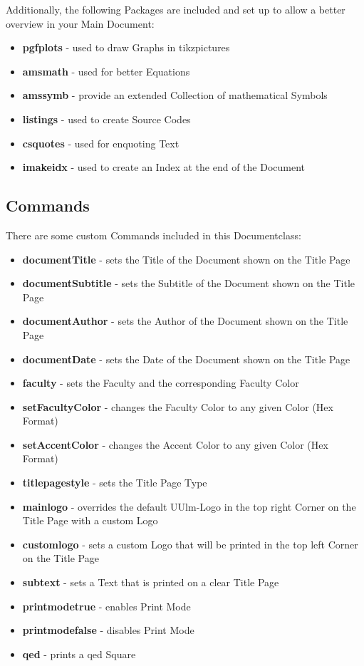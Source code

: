 \documentclass[a4paper]{../uulm-document}
\begin{document}
Additionally, the following Packages are included and set up to allow a better overview in your Main Document:
\begin{itemize}
\item \textbf{pgfplots} - used to draw Graphs in tikzpictures
\item \textbf{amsmath} - used for better Equations
\item \textbf{amssymb} - provide an extended Collection of mathematical Symbols
\item \textbf{listings} - used to create Source Codes
\item \textbf{csquotes} - used for enquoting Text
\item \textbf{imakeidx} - used to create an Index at the end of the Document
\end{itemize}

\subsection{Commands}
There are some custom Commands included in this Documentclass:
\begin{itemize}
\item \textbf{documentTitle} - sets the Title of the Document shown on the Title Page
\item \textbf{documentSubtitle} - sets the Subtitle of the Document shown on the Title Page
\item \textbf{documentAuthor} - sets the Author of the Document shown on the Title Page
\item \textbf{documentDate} - sets the Date of the Document shown on the Title Page
\item \textbf{faculty} - sets the Faculty and the corresponding Faculty Color
\item \textbf{setFacultyColor} - changes the Faculty Color to any given Color (Hex Format)
\item \textbf{setAccentColor} - changes the Accent Color to any given Color (Hex Format)
\item \textbf{titlepagestyle} - sets the Title Page Type
\item \textbf{mainlogo} - overrides the default UUlm-Logo in the top right Corner on the Title Page with a custom Logo
\item \textbf{customlogo} - sets a custom Logo that will be printed in the top left Corner on the Title Page
\item \textbf{subtext} - sets a Text that is printed on a clear Title Page
\item \textbf{printmodetrue} - enables Print Mode
\item \textbf{printmodefalse} - disables Print Mode
\item \textbf{qed} - prints a qed Square
\end{itemize}
\end{document}
